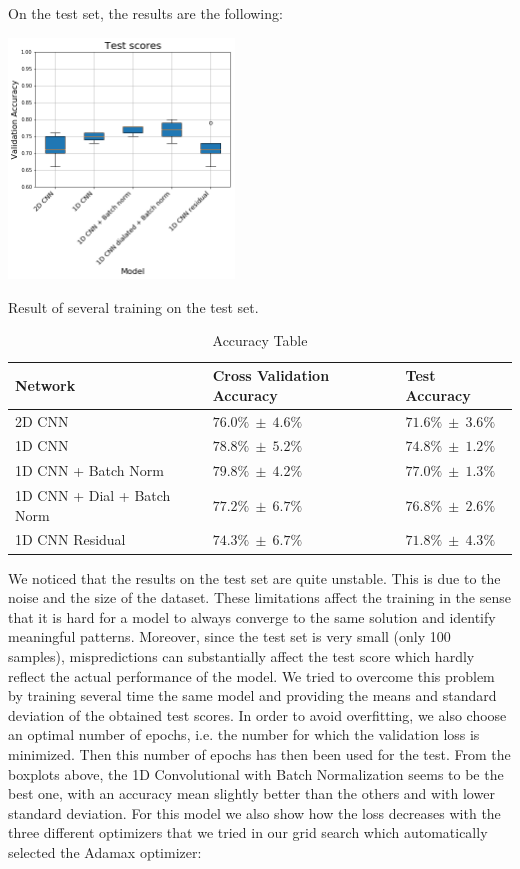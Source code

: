 \documentclass[10pt,conference,compsocconf]{IEEEtran}
\begin{document}
On the test set, the results are the following:

\begin{center}
	\captionsetup{type=figure}
	\includegraphics[width=0.45\textwidth]{img/TestVal.png}
	\caption {Result of several training on the test set.}
	\label{fig:CrossVal}
\end{center}

\begin{table}[H]
	\caption{Accuracy Table}
	\label{tab:accuracy}
	\begin{tabular}{ | p{3cm} |  p{2cm} |  p{2.1cm} | }
		\hline
		Network & Cross Validation Accuracy & Test Accuracy\\
		\hline
		2D CNN
		& $76.0\% \: \pm \: 4.6\%$ & $71.6\% \: \pm \: 3.6\%$ \\
		\hline
		1D CNN
		& $78.8\% \: \pm \: 5.2\%$ & $74.8\% \: \pm \: 1.2\%$\\
		\hline
		1D CNN + Batch Norm
		& $79.8\% \: \pm \: 4.2\%$ & $77.0\% \: \pm \: 1.3\%$\\
		\hline
		1D CNN + Dial + Batch Norm
		& $77.2\% \: \pm \: 6.7\%$ & $76.8\% \: \pm \: 2.6\%$\\
		\hline
		1D CNN Residual
		& $74.3\% \: \pm \: 6.7\%$ & $71.8\% \: \pm \: 4.3\%$\\
		\hline
	\end{tabular}
\end{table}

We noticed that the results on the test set are quite unstable. This is due to the noise and the size of the dataset. These limitations affect the training in the sense that it is hard for a model to always converge to the same solution  and identify meaningful patterns. Moreover, since the test set is very small (only 100 samples), mispredictions can substantially affect the test score which hardly reflect the actual performance of the model. We tried to overcome this problem by training several time the same model and providing the means and standard deviation of the obtained test scores. In order to avoid overfitting, we also choose an optimal number of epochs, i.e. the number for which the validation loss is minimized. Then this number of epochs has then been used for the test. From the boxplots above, the 1D Convolutional with Batch Normalization seems to be the best one, with an accuracy mean slightly better than the others and with lower standard deviation. For this model we also show how the loss decreases with the three different optimizers that we tried in our grid search which automatically selected the Adamax optimizer:
\end{document}
